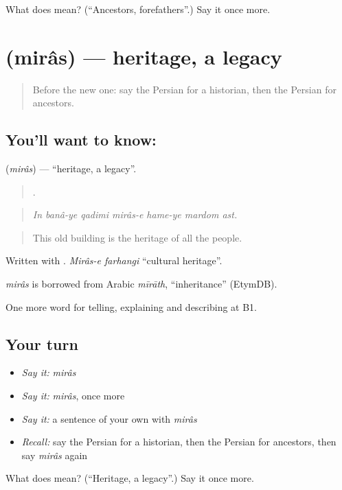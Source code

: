 \begin{tcolorbox}[breakable,colback=teal!4,colframe=teal!35!black,title={Before you move on}]
What does  mean? (\textquotedblleft{}Ancestors, forefathers\textquotedblright{}.) Say it once more.
\end{tcolorbox}
\section[\texorpdfstring{\fa{میراث} (mirâs)}{میراث (mirâs)}]{ (mirâs) — heritage, a legacy}

\label{lesson:FA-C353-miras}



\begin{quote}
Before the new one: say the Persian for a historian, then the Persian for ancestors.
\end{quote}

\subsection*{You'll want to know: }
\textbf{} (\emph{mirâs}) — \textquotedblleft{}heritage, a legacy\textquotedblright{}.

\begin{quote}
      .
\end{quote}

\begin{quote}
\emph{In banâ-ye qadimi mirâs-e hame-ye mardom ast.}
\end{quote}

\begin{quote}
This old building is the heritage of all the people.
\end{quote}

Written with . \emph{Mirâs-e farhangi} \textquotedblleft{}cultural heritage\textquotedblright{}.

\begin{cousinweb}
\emph{mirâs} is borrowed from Arabic \emph{mīrāth}, \textquotedblleft{}inheritance\textquotedblright{} (EtymDB).
\end{cousinweb}

\begin{grammarlens}[title={What you've built}]
One more word for telling, explaining and describing at B1.
\end{grammarlens}

\subsection*{Your turn}
\begin{itemize}
\raggedright
  \item \emph{Say it:} \emph{mirâs}
  \item \emph{Say it:} \emph{mirâs}, once more
  \item \emph{Say it:} a sentence of your own with \emph{mirâs}
  \item \emph{Recall:} say the Persian for a historian, then the Persian for ancestors, then say \emph{mirâs} again
\end{itemize}

\begin{tcolorbox}[breakable,colback=teal!4,colframe=teal!35!black,title={Before you move on}]
What does  mean? (\textquotedblleft{}Heritage, a legacy\textquotedblright{}.) Say it once more.
\end{tcolorbox}
